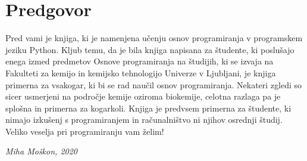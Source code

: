 \chapter*{Predgovor}

Pred vami je knjiga, ki je namenjena učenju osnov programiranja v programskem jeziku Python. Kljub temu, da je bila knjiga napisana za študente, ki poslušajo enega izmed predmetov Osnove programiranja na študijih, ki se izvaja na Fakulteti za kemijo in kemijsko tehnologijo Univerze v Ljubljani, je knjiga primerna za vsakogar, ki bi se rad naučil osnov programiranja. Nekateri zgledi so sicer usmerjeni na področje kemije oziroma biokemije, celotna razlaga pa je splošna in primerna za kogarkoli. Knjiga je predvsem primerna za študente, ki nimajo izkušenj s programiranjem in računalništvo ni njihov osrednji študij. Veliko veselja pri programiranju vam želim!

\begin{flushright}
\textit{Miha Moškon, 2020}
\end{flushright}
